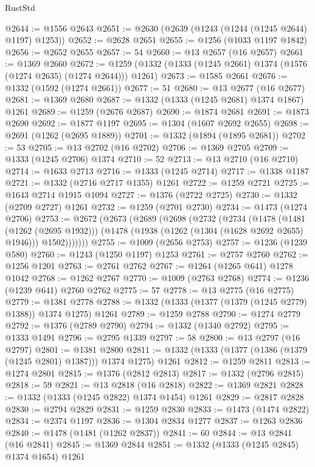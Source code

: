 \begin{lexlean}{RustStd}
\begin{coremodule}
@2644 := @1556 @2643
@2651 := @2630 (@2639 (@1243 (@1244 (@1245 @2644) @1197) @1253))
@2652 := @2628 @2651
@2655 := @1256 (@1033 @1197 @1842)
@2656 := @2652 @2655
@2657 := 54
@2660 := @13 @2657 (@16 @2657)
@2661 := @1369 @2660
@2672 := @1259 (@1332 (@1333 (@1245 @2661) @1374 (@1576 (@1274 @2635) (@1274 @2644))) @1261)
@2673 := @1585 @2661
@2676 := @1332 (@1592 (@1274 @2661))
@2677 := 51
@2680 := @13 @2677 (@16 @2677)
@2681 := @1369 @2680
@2687 := @1332 (@1333 (@1245 @2681) @1374 @1867) @1261
@2689 := @1259 (@2676 @2687)
@2690 := @1874 @2681
@2691 := @1873 @2690
@2692 := @1877 @1197
@2695 := @1304 (@1607 @2692 @2655)
@2698 := @2691 (@1262 (@2695 @1889))
@2701 := @1332 (@1894 (@1895 @2681))
@2702 := 53
@2705 := @13 @2702 (@16 @2702)
@2706 := @1369 @2705
@2709 := @1333 (@1245 @2706) @1374
@2710 := 52
@2713 := @13 @2710 (@16 @2710)
@2714 := @1633 @2713
@2716 := @1333 (@1245 @2714)
@2717 := @1338 @1187
@2721 := @1332 (@2716 @2717 @1355) @1261
@2722 := @1259 @2721
@2725 := @1643 @2714 @1915 @1094
@2727 := @1376 (@2722 @2725)
@2730 := @1332 (@2709 @2727) @1261
@2732 := @1259 (@2701 @2730)
@2734 := @1473 (@1274 @2706)
@2753 := @2672
    (@2673
      (@2689
        (@2698
          (@2732
            (@2734
              (@1478
                (@1481 (@1262 (@2695 @1932)))
                (@1478 (@1938 (@1262 (@1304 (@1628 @2692 @2655) @1946))) @1502)))))))
@2755 := @1009 (@2656 @2753)
@2757 := @1236 (@1239 @580)
@2760 := @1243 (@1250 @1197) @1253
@2761 := @2757 @2760
@2762 := @1256 @1201
@2763 := @2761 @2762
@2767 := @1264 (@1265 @641) @1278 @1042
@2768 := @1262 @2767
@2770 := @1009 (@2763 @2768)
@2774 := @1236 (@1239 @641) @2760 @2762
@2775 := 57
@2778 := @13 @2775 (@16 @2775)
@2779 := @1381 @2778
@2788 := @1332 (@1333 (@1377 (@1379 (@1245 @2779) @1388)) @1374 @1275) @1261
@2789 := @1259 @2788
@2790 := @1274 @2779
@2792 := @1376 (@2789 @2790)
@2794 := @1332 (@1340 @2792)
@2795 := @1333 @1491
@2796 := @2795 @1339
@2797 := 58
@2800 := @13 @2797 (@16 @2797)
@2801 := @1381 @2800
@2811 := @1332 (@1333 (@1377 (@1386 (@1379 (@1245 @2801) @1387))) @1374 @1275) @1261
@2812 := @1259 @2811
@2813 := @1274 @2801
@2815 := @1376 (@2812 @2813)
@2817 := @1332 (@2796 @2815)
@2818 := 59
@2821 := @13 @2818 (@16 @2818)
@2822 := @1369 @2821
@2828 := @1332 (@1333 (@1245 @2822) @1374 @1454) @1261
@2829 := @2817 @2828
@2830 := @2794 @2829
@2831 := @1259 @2830
@2833 := @1473 (@1474 @2822)
@2834 := @2374 @1197
@2836 := @1304 @2834 @1277
@2837 := @1263 @2836
@2840 := @1478 (@1481 (@1262 @2837))
@2841 := 60
@2844 := @13 @2841 (@16 @2841)
@2845 := @1369 @2844
@2851 := @1332 (@1333 (@1245 @2845) @1374 @1654) @1261

\end{coremodule}
\end{lexlean}
